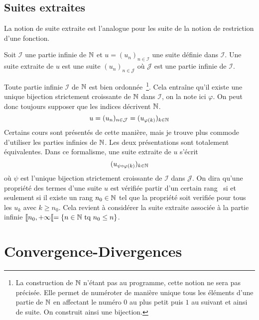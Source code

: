 \subsection{Suites extraites}
 La notion de suite extraite est l'analogue pour les suite de la notion de restriction d'une fonction. 
\begin{defi}
Soit $\mathcal{I}$ une partie infinie de $\mathbb{N}$ et $u=(u_n)_{n \in \mathcal{I}}$ une suite définie dans $\mathcal{I}$. Une suite extraite de $u$ est une suite $(u_n)_{n \in \mathcal{J}}$ où $\mathcal{J}$ est une partie infinie de $\mathcal{I}$.   
\end{defi}
Toute partie infinie $\mathcal{I}$ de $\mathbb{N}$ est \og bien ordonnée\fg~\footnote{La construction de $\mathbb{N}$ n'étant pas au programme, cette notion ne sera pas précisée. Elle permet de numéroter de manière unique tous les éléments d'une partie de $\mathbb{N}$ en affectant le numéro $0$ au plus petit puis $1$ au suivant et ainsi de suite. On construit ainsi une bijection.}. Cela entraîne qu'il existe une unique bijection strictement croissante de $\mathbb{N}$ dans $\mathcal{I}$, on la note ici $\varphi$. On peut donc toujours supposer que les indices décrivent $\mathbb{N}$.
\begin{displaymath}
  u = (u_n)_{n \in \mathcal{J}} = (u_{\varphi(k)})_{k \in \mathbb{N}}
\end{displaymath}
Certains cours sont présentés de cette manière, mais je trouve plus commode d'utiliser les parties infinies de $\mathbb{N}$. Les deux présentations sont totalement équivalentes. Dans ce formalisme, une suite extraite de $u$ s'écrit
\begin{displaymath}
  (u_{\psi\circ\varphi(k)})_{k \in \mathbb{N}}
\end{displaymath}
où $\psi$ est l'unique bijection strictement croissante de $\mathcal{I}$ dans $\mathcal{J}$.\newline
On dira qu'une propriété des termes d'une suite $u$ est vérifiée  partir d'un certain rang\fg~ si et seulement si il existe un rang $n_0\in \mathbb{N}$ tel que la propriété soit verifiée pour tous les $u_k$ avec $k\geq n_0$. Cela revient à considérer la suite extraite associée à la partie infinie $\llbracket n_0, +\infty\llbracket = \left\lbrace n\in \mathbb{N} \text{ tq } n_0 \leq n\right\rbrace$.

\section{Convergence-Divergences}
